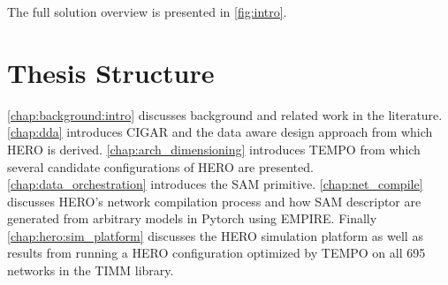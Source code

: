 The full solution overview is presented in \autoref{fig:intro}.

\section{Thesis Structure}
\label{chap:intro:thesis_structure}

\autoref{chap:background:intro} discusses background and related work in the
literature. \autoref{chap:dda} introduces \ac{CIGAR} and the data aware design
approach from which \ac{HERO} is derived. \autoref{chap:arch_dimensioning}
introduces \ac{TEMPO} from which several candidate configurations of HERO are
presented. \autoref{chap:data_orchestration} introduces the SAM primitive.
\autoref{chap:net_compile} discusses HERO's network compilation process and how
SAM descriptor are generated from arbitrary models in Pytorch using \ac{EMPIRE}.
Finally \autoref{chap:hero:sim_platform} discusses the HERO simulation platform
as well as results from running a HERO configuration optimized by TEMPO on all
695 networks in the TIMM library. 

